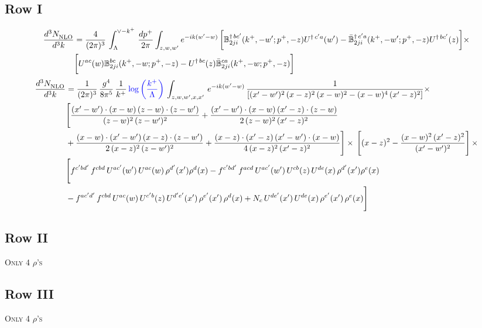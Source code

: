 \documentclass[9pt]{article}
\def\mf#1{\mathbb{#1}}
\numberwithin{equation}{section}
\begin{document}
\subsection{Row I}
\begin{align}
    \frac{d^{3}N_{\rm NLO}^{\rm}}{d^{3}k}  & = \frac{4}{(2\pi)^{3}}\,\int_{\Lambda}^{\vee-k^{+}}\, \frac{dp^{+}}{2\pi}\int_{z,w,w^{\prime}} e^{-ik(w^{\prime}-w)}\, \bigg[\mf{B}^{\dagger\, bc^{\prime}}_{2ji}(k^{+},-w^{\prime};p^{+},-z)U^{\dagger\,c^{\prime}a}(w^{\prime}) -\Bar{\mf{B}}^{\dagger\, c^{\prime}a}_{2ji}(k^{+},-w^{\prime}; p^{+},-z)U^{\dagger\,bc^{\prime}}(z)\bigg]\times\notag \\ & \bigg[U^{ac}(w) \mf{B}^{bc}_{2ji}(k^{+},-w;p^{+},-z) -U^{\dagger\, bc}(z)\Bar{\mf{B}}^{ca}_{2ji}(k^{+},-w; p^{+},-z)\bigg]\nonumber
\end{align}
\begin{align}
 \frac{d^{3}N_{\rm NLO}^{\rm}}{d^{3}k}  & =     \frac{1}{(2\pi)^{3}}\, \frac{g^{4}}{8\pi^{5}}\,\frac{1}{k^{+}}\,{\color{blue}\log{\left(\frac{k^{+}}{\Lambda}\right)}}\,\int_{z,w,w^{\prime},x,x'}\, e^{-ik(w^{\prime}-w)}\, \frac{1}{\left[(x'-w')^{2}\,(x-z)^{2}\,(x-w)^{2} - (x-w)^{4}\, (x'-z)^{2}\right]} \times\notag \\ & \Bigg[\frac{(x'-w')\cdot (x-w)\, (z-w)\cdot (z-w')}{(z-w)^{2}\, (z-w')^{2}}+\frac{(x'-w')\cdot (x-w)\, (x'-z)\cdot (z-w)}{2\, (z-w)^{2}\, (x'-z)^{2}}\notag \\ & +\frac{(x-w)\cdot (x'-w')\, (x-z)\cdot (z-w')}{2\, (x-z)^{2}\, (z-w')^{2}}+\frac{(x-z)\cdot (x'-z)\, (x'-w')\cdot (x-w)}{4\, (x-z)^{2}\, (x'-z)^{2}}\Bigg] \times\,\Bigg[(x-z)^{2} - \frac{(x-w)^{2}\, (x'-z)^{2}}{(x'-w')^{2}}\Bigg]\,\times \notag \\ & \Bigg[f^{c'bd'}\,f^{cbd}\, U^{ac'}(w')\,U^{ac}(w)\,\rho^{d'}(x')\rho^{d}(x)- f^{c'bd'}\,f^{acd}\,U^{ac'}(w')\,U^{cb}(z)\,U^{de}(x)\,\rho^{d'}(x')\rho^{e}(x) \notag \\ & -f^{ac'd'}\,f^{cbd}\,U^{ac}(w)\,U^{c'b}(z)\,U^{d'e'}(x')\,\rho^{e'}(x')\,\rho^{d}(x) +N_{c}\,U^{de'}(x')\,U^{de}(x)\,\rho^{e'}(x')\,\rho^{e}(x)\Bigg]
\end{align}
\subsection{Row II}
\textsc{Only 4 $\rho$'s}
\subsection{Row III}
\textsc{Only 4 $\rho$'s}
\end{document}
